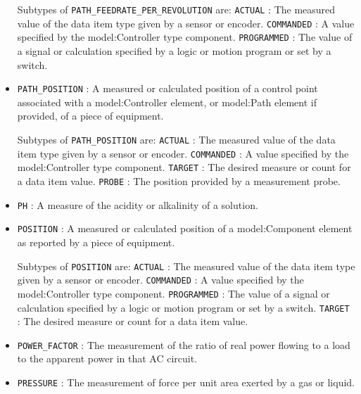 \begin{itemize}
Subtypes of \texttt{PATH_FEEDRATE_PER_REVOLUTION} are: 
\newline\tab \texttt{ACTUAL} : The measured value of the data item type given by a sensor or encoder. 
\newline\tab \texttt{COMMANDED} : A value specified by the {model:Controller} type component. 
\newline\tab \texttt{PROGRAMMED} : The value of a signal or calculation specified by a logic or motion program or set by a switch. 
\item \texttt{PATH_POSITION} : A measured or calculated position of a control point associated with a {model:Controller} element, or {model:Path} element if provided, of a piece of equipment. 

Subtypes of \texttt{PATH_POSITION} are: 
\newline\tab \texttt{ACTUAL} : The measured value of the data item type given by a sensor or encoder. 
\newline\tab \texttt{COMMANDED} : A value specified by the {model:Controller} type component. 
\newline\tab \texttt{TARGET} : The desired measure or count for a data item value. 
\newline\tab \texttt{PROBE} : The position provided by a measurement probe. 
\item \texttt{PH} : A measure of the acidity or alkalinity of a solution. 

\item \texttt{POSITION} : A measured or calculated position of a {model:Component} element as reported by a piece of equipment. 

Subtypes of \texttt{POSITION} are: 
\newline\tab \texttt{ACTUAL} : The measured value of the data item type given by a sensor or encoder. 
\newline\tab \texttt{COMMANDED} : A value specified by the {model:Controller} type component. 
\newline\tab \texttt{PROGRAMMED} : The value of a signal or calculation specified by a logic or motion program or set by a switch. 
\newline\tab \texttt{TARGET} : The desired measure or count for a data item value. 
\item \texttt{POWER_FACTOR} : The measurement of the ratio of real power flowing to a load to the apparent power in that AC circuit. 

\item \texttt{PRESSURE} : The measurement of force per unit area exerted by a gas or liquid. 


\end{itemize}
